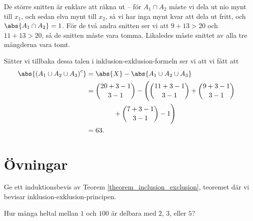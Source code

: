 \documentclass[nobib]{tufte-handout}
\begin{document}
\begin{example}
  De större snitten är enklare att räkna ut -- för $A_1\cap A_2$ måste vi dela ut nio mynt till $x_1$, och sedan elva mynt till $x_2$, så vi har inga mynt kvar att dela ut fritt, och $\abs{A_1 \cap A_2} = 1$. För de två andra snitten ser vi att $9 + 13 > 20$ och $11 + 13 > 20$, så de snitten måste vara tomma. Likaledes måste snittet av alla tre mängderna vara tomt.

  Sätter vi tillbaka dessa talen i inklusion-exklusion-formeln ser vi att vi fått att
  \begin{align*}
    \abs{\left(A_1 \cup A_2 \cup A_3\right)^c} &= \abs{X} - \abs{A_1 \cup A_2 \cup A_3}\\
    &= \binom{20 + 3 - 1}{3 - 1} - \Bigg(\binom{11+3-1}{3-1}+ \binom{9+3-1}{3-1}\\
    &\qquad\qquad + \binom{7+3-1}{3-1}- 1\Bigg)\\
    &= 63.
  \end{align*}
\end{example}

\section{Övningar}

\begin{xca}
  Ge ett induktionsbevis av Teorem \ref{theorem_inclusion_exclusion}, teoremet där vi bevisar inklusion-exklusion-principen.
\end{xca}

\begin{xca}
  Hur många heltal mellan $1$ och $100$ är delbara med $2$, $3$, eller $5$?
\end{xca}

%
%
\end{document}
